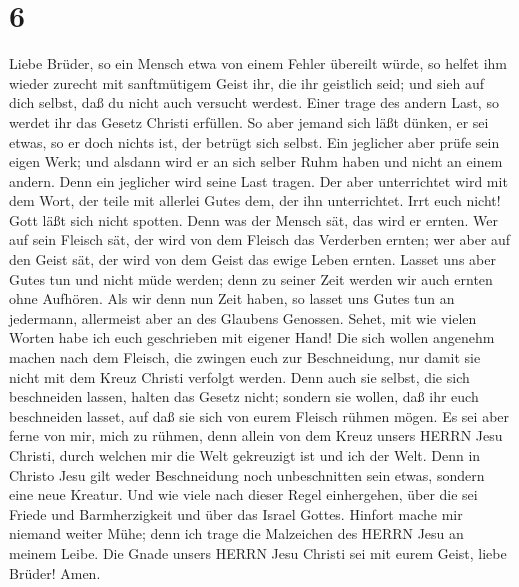 \hypertarget{section-5}{%
\section{6}\label{section-5}}

 Liebe Brüder, so ein Mensch etwa von einem Fehler übereilt
würde, so helfet ihm wieder zurecht mit sanftmütigem Geist ihr, die ihr
geistlich seid; und sieh auf dich selbst, daß du nicht auch versucht
werdest.  Einer trage des andern Last, so werdet ihr das
Gesetz Christi erfüllen.  So aber jemand sich läßt dünken,
er sei etwas, so er doch nichts ist, der betrügt sich selbst.
 Ein jeglicher aber prüfe sein eigen Werk; und alsdann wird
er an sich selber Ruhm haben und nicht an einem andern. 
Denn ein jeglicher wird seine Last tragen.  Der aber
unterrichtet wird mit dem Wort, der teile mit allerlei Gutes dem, der
ihn unterrichtet.  Irrt euch nicht! Gott läßt sich nicht
spotten. Denn was der Mensch sät, das wird er ernten.  Wer
auf sein Fleisch sät, der wird von dem Fleisch das Verderben ernten; wer
aber auf den Geist sät, der wird von dem Geist das ewige Leben ernten.
 Lasset uns aber Gutes tun und nicht müde werden; denn zu
seiner Zeit werden wir auch ernten ohne Aufhören.  Als wir
denn nun Zeit haben, so lasset uns Gutes tun an jedermann, allermeist
aber an des Glaubens Genossen.  Sehet, mit wie vielen
Worten habe ich euch geschrieben mit eigener Hand!  Die
sich wollen angenehm machen nach dem Fleisch, die zwingen euch zur
Beschneidung, nur damit sie nicht mit dem Kreuz Christi verfolgt werden.
 Denn auch sie selbst, die sich beschneiden lassen, halten
das Gesetz nicht; sondern sie wollen, daß ihr euch beschneiden lasset,
auf daß sie sich von eurem Fleisch rühmen mögen.  Es sei
aber ferne von mir, mich zu rühmen, denn allein von dem Kreuz unsers
HERRN Jesu Christi, durch welchen mir die Welt gekreuzigt ist und ich
der Welt.  Denn in Christo Jesu gilt weder Beschneidung
noch unbeschnitten sein etwas, sondern eine neue Kreatur. 
Und wie viele nach dieser Regel einhergehen, über die sei Friede und
Barmherzigkeit und über das Israel Gottes.  Hinfort mache
mir niemand weiter Mühe; denn ich trage die Malzeichen des HERRN Jesu an
meinem Leibe.  Die Gnade unsers HERRN Jesu Christi sei mit
eurem Geist, liebe Brüder! Amen.
